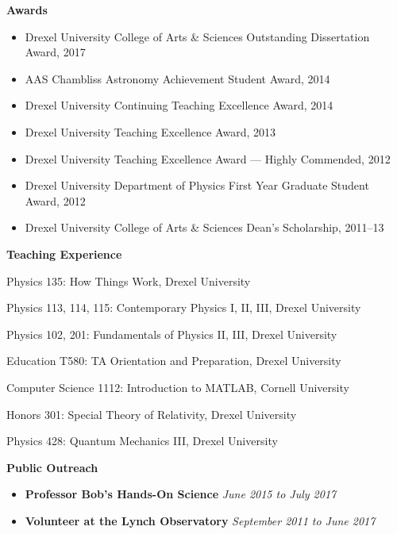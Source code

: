 \begin{vita}
\noindent
{\large\bf {\sc Awards}}

\sectionrule

\begin{itemize}[noitemsep]
    \item Drexel University College of Arts \& Sciences Outstanding Dissertation Award, 2017
    \item AAS Chambliss Astronomy Achievement Student Award, 2014
    \item Drexel University Continuing Teaching Excellence Award, 2014
    \item Drexel University Teaching Excellence Award, 2013
    \item Drexel University Teaching Excellence Award --- Highly Commended, 2012
    \item Drexel University Department of Physics First Year Graduate Student Award, 2012
    \item Drexel University College of Arts \& Sciences Dean's Scholarship, 2011--13
\end{itemize}

\noindent
{\large\bf {\sc Teaching Experience}}

\sectionrule

\begin{description}[noitemsep]
    \item[Teaching Assistant] Physics 135: How Things Work, Drexel University
    \item[Teaching Assistant] Physics 113, 114, 115: Contemporary Physics I, II, III, Drexel University
    \item[Teaching Assistant] Physics 102, 201: Fundamentals of Physics II, III, Drexel University
    \item[Teaching Assistant] Education T580: TA Orientation and Preparation, Drexel University
    \item[Teaching Assistant \& Consultant] Computer Science 1112: Introduction to MATLAB, Cornell University
    \item[Grader] Honors 301: Special Theory of Relativity, Drexel University
    \item[Grader] Physics 428: Quantum Mechanics III, Drexel University
\end{description}

\noindent
{\large\bf {\sc Public Outreach}}

\sectionrule

\begin{itemize}[noitemsep]
	\item \textbf{Professor Bob's Hands-On Science} \hfill \textit{June 2015 to July 2017}
	\item \textbf{Volunteer at the Lynch Observatory} \hfill \textit{September 2011 to June 2017}
\end{itemize}

\end{vita}